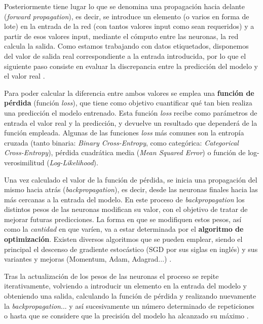 Posteriormente tiene lugar lo que se denomina una propagación hacia delante (\textit{forward propagation}), es decir, se introduce un elemento (o varios en forma de lote) en la entrada de la red (con tantos valores input como sean requeridos) y a partir de esos valores input, mediante el cómputo entre las neuronas, la red calcula la salida. Como estamos trabajando con datos etiquetados, disponemos del valor de salida real correspondiente a la entrada introducida, por lo que el siguiente paso consiste en evaluar la discrepancia entre la predicción del modelo y el valor real \cite{cnn:biblia_deeplearning,cnn:biblia_machinelearning}.

Para poder calcular la diferencia entre ambos valores se emplea una \textbf{función de pérdida} (función \textit{loss}), que tiene como objetivo cuantificar qué tan bien realiza una predicción el modelo entrenado. Esta función \textit{loss} recibe como parámetros de entrada el valor real y la predicción, y devuelve un resultado que dependerá de la función empleada.  Algunas de las funciones \textit{loss} más comunes son la entropía cruzada (tanto binaria: \textit{Binary Cross-Entropy}, como categórica: \textit{Categorical Cross-Entropy}), pérdida cuadrática media (\textit{Mean Squared Error}) o función de log-verosimilitud (\textit{Log-Likelihood})\cite{cnn:biblia_deeplearning}.

Una vez calculado el valor de la función de pérdida, se inicia una propagación del mismo hacia atrás (\textit{backpropagation}), es decir, desde las neuronas finales hacia las más cercanas a la entrada del modelo. En este proceso de \textit{backpropagation} los distintos pesos de las neuronas modifican su valor, con el objetivo de tratar de mejorar futuras predicciones. La forma en que se modifiquen estos pesos, así como la \textit{cantidad} en que varíen, va a estar determinada por el \textbf{algoritmo de optimización}. Existen diversos algoritmos que se pueden emplear, siendo el principal el descenso de gradiente estocástico (SGD por sus siglas en inglés) y sus variantes y mejoras (Momentum, Adam, Adagrad...) \cite{cnn:biblia_deeplearning,cnn:biblia_machinelearning}.

Tras la actualización de los pesos de las neuronas el proceso se repite iterativamente, volviendo a introducir un elemento en la entrada del modelo y obteniendo una salida, calculando la función de pérdida y realizando nuevamente la \textit{backpropagation}... y así sucesivamente un número determinado de repeticiones o hasta que se considere que la precisión del modelo ha alcanzado su máximo \cite{cnn:biblia_deeplearning}.

